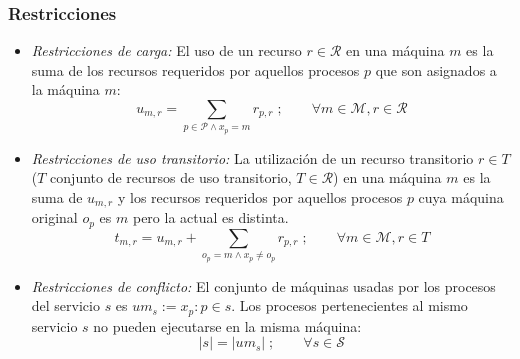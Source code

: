 \documentclass[../informe2.tex]{subfiles}
\begin{document}
\subsubsection{Restricciones}
\begin{itemize}
	\item \textit{Restricciones de carga:} El uso de un recurso $r \in \mathcal{R}$ en una máquina $m$ es la suma de los recursos requeridos por aquellos procesos $p$ que son asignados a la máquina $m$:
		\begin{equation}\label{modelo2:r1}
			u_{m,r} = \sum_{p \in \mathcal{P} \wedge x_p = m}r_{p,r}\;; \qquad \forall m \in \mathcal{M}, r \in \mathcal{R}
		\end{equation}

	\item \textit{Restricciones de uso transitorio:} La utilización de un recurso transitorio $r \in T$ ($T$ conjunto de recursos de uso transitorio, $T \in \mathcal{R}$) en una máquina $m$ es la suma de $u_{m,r}$ y los recursos requeridos por aquellos procesos $p$ cuya máquina original $o_p$ es $m$ pero la actual es distinta.
		\begin{equation}\label{modelo2:r2}
			t_{m,r} = u_{m,r} + \sum_{o_p=m \wedge x_p \neq o_p}r_{p,r}\;; \qquad \forall m \in \mathcal{M}, r \in T
		\end{equation}

	\item \textit{Restricciones de conflicto:} El conjunto de máquinas usadas por los procesos del servicio $s$ es $um_s := {x_p:p \in s}$. Los procesos pertenecientes al mismo servicio $s$ no pueden ejecutarse en la misma máquina:
		\begin{equation}\label{modelo2:r3}
			|s| = |um_s|\;; \qquad \forall s \in \mathcal{S}
		\end{equation}


\end{itemize}
\end{document}
